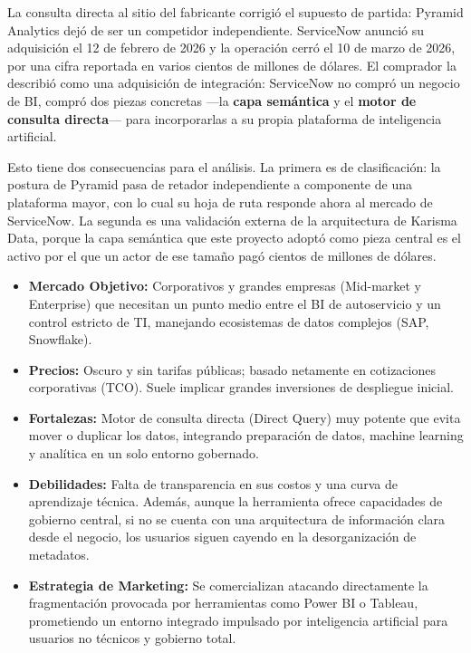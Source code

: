 \begin{uxnota}
La consulta directa al sitio del fabricante corrigió el supuesto de partida: Pyramid Analytics dejó de ser un competidor independiente. ServiceNow anunció su adquisición el 12 de febrero de 2026 y la operación cerró el 10 de marzo de 2026, por una cifra reportada en varios cientos de millones de dólares. El comprador la describió como una adquisición de integración: ServiceNow no compró un negocio de BI, compró dos piezas concretas ---la \textbf{capa semántica} y el \textbf{motor de consulta directa}--- para incorporarlas a su propia plataforma de inteligencia artificial.

Esto tiene dos consecuencias para el análisis. La primera es de clasificación: la postura de Pyramid pasa de retador independiente a componente de una plataforma mayor, con lo cual su hoja de ruta responde ahora al mercado de ServiceNow. La segunda es una validación externa de la arquitectura de Karisma Data, porque la capa semántica que este proyecto adoptó como pieza central es el activo por el que un actor de ese tamaño pagó cientos de millones de dólares.
\end{uxnota}
\begin{itemize}
    \item \textbf{Mercado Objetivo:} Corporativos y grandes empresas (Mid-market y Enterprise) que necesitan un punto medio entre el BI de autoservicio y un control estricto de TI, manejando ecosistemas de datos complejos (SAP, Snowflake).
    \item \textbf{Precios:} Oscuro y sin tarifas públicas; basado netamente en cotizaciones corporativas (TCO). Suele implicar grandes inversiones de despliegue inicial.
    \item \textbf{Fortalezas:} Motor de consulta directa (Direct Query) muy potente que evita mover o duplicar los datos, integrando preparación de datos, machine learning y analítica en un solo entorno gobernado.
    \item \textbf{Debilidades:} Falta de transparencia en sus costos y una curva de aprendizaje técnica. Además, aunque la herramienta ofrece capacidades de gobierno central, si no se cuenta con una arquitectura de información clara desde el negocio, los usuarios siguen cayendo en la desorganización de metadatos.
    \item \textbf{Estrategia de Marketing:} Se comercializan atacando directamente la fragmentación provocada por herramientas como Power BI o Tableau, prometiendo un entorno integrado impulsado por inteligencia artificial para usuarios no técnicos y gobierno total.
\end{itemize}


